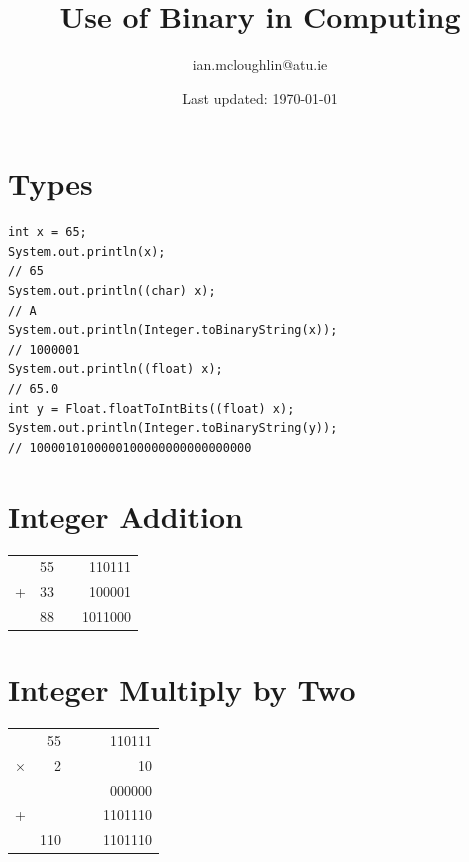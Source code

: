 \documentclass{iansnotes}
\title{Use of Binary in Computing}
\author{ian.mcloughlin@atu.ie}
\date{Last updated: \today}
\begin{document}
 
\maketitle

\section{Types}

\begin{verbatim}
int x = 65;
System.out.println(x);
// 65
System.out.println((char) x);
// A
System.out.println(Integer.toBinaryString(x));
// 1000001
System.out.println((float) x);
// 65.0
int y = Float.floatToIntBits((float) x);
System.out.println(Integer.toBinaryString(y));
// 1000010100000100000000000000000 
\end{verbatim}


\section{Integer Addition}
\begin{table}
\begin{tabular}{rrrr}
    & 55 &   &  110111 \\
  + & 33 &   &  100001 \\
  \midrule
    & 88 &   & 1011000 \\
\end{tabular}
\end{table}


\section{Integer Multiply by Two}
\begin{table}
\begin{tabular}{rrrrr}
           &  55 & &   &  110111 \\
  $\times$ &   2 & &   &      10 \\
  \midrule
           &     & &   &  000000 \\
  +        &     & &   & 1101110 \\
  \midrule
           & 110 & &   & 1101110 \\
\end{tabular}
\end{table}
\end{document}
